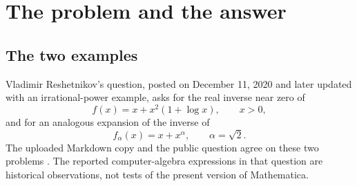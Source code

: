 \documentclass[11pt,a4paper]{article}
\numberwithin{equation}{section}
\theoremstyle{definition}
\begin{document}
\begin{abstract}
The inverse of $x+x^2(1+\log x)$ at $0^+$ is not an ordinary Taylor series,
and the inverse of $x+x^{\sqrt2}$ requires irrational exponents. Both are
instances of an elementary but useful inversion calculus for finite
power--logarithmic perturbations of a positive monomial. We prove existence
and selection of the positive real branch, a closed multi-index coefficient
formula, local convergence of the resulting generalized series for exact
finite models, and quantitative asymptotic remainder orders for arbitrary
weighted truncations. A finite border of an order ideal determines the first
possible omitted power and a safe logarithmic degree, even when generator
weights collide. A separate Newton algorithm in a truncated logarithmic
jet algebra gives the same inverse, and forward residuals transfer to
inverse errors after the correct derivative rescaling. We also treat
finite forward expansions with differentiated remainder bounds, explain
why a bound on the forward function alone need not preserve invertibility,
and state the boundaries of the implemented class. The accompanying
Wolfram Language package contains both coefficient and Newton engines,
exact exponent ordering, explicit failure cases, residual inspection, and a
more general auxiliary-parameter inversion utility. Complete examples,
proofs, reproducible verification programs, a native regression suite,
and the full package listing accompany the article.
\end{abstract}

\tableofcontents
\newpage
{}

\section{The problem and the answer}
\label{sec:answer}

\subsection{The two examples}
Vladimir Reshetnikov's question, posted on December 11, 2020 and later
updated with an irrational-power example, asks for the real inverse near
zero of
\begin{equation}\label{eq:original}
 f(x)=x+x^2(1+\log x),\qquad x>0,
\end{equation}
and for an analogous expansion of the inverse of
\begin{equation}\label{eq:irr-original}
 f_\alpha(x)=x+x^\alpha,\qquad \alpha=\sqrt2.
\end{equation}
The uploaded Markdown copy and the public question agree on these two
problems \cite{question}. The reported computer-algebra expressions in that
question are historical observations, not tests of the present version of
Mathematica.
\end{document}
